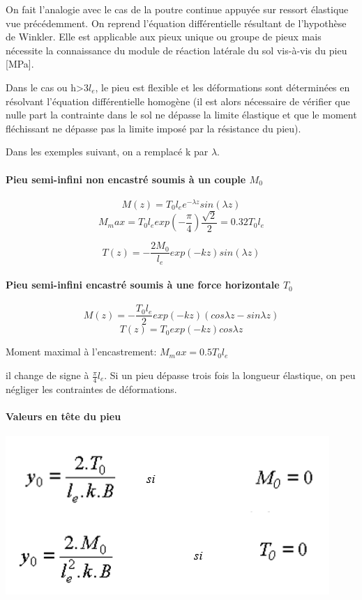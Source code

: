 On fait l'analogie avec le cas de la poutre continue appuyée sur ressort élastique vue précédemment. On reprend l'équation différentielle résultant de l'hypothèse de Winkler. Elle est applicable aux pieux unique ou groupe de pieux mais nécessite la connaissance du module de réaction latérale du sol vis-à-vis du pieu [MPa].

Dans le cas ou h>3$l_e$, le pieu est flexible et les déformations sont déterminées en résolvant l'équation différentielle homogène (il est alors nécessaire de vérifier que nulle part la contrainte dans le sol ne dépasse la limite élastique et que le moment fléchissant ne dépasse pas la limite imposé par la résistance du pieu).

Dans les exemples suivant, on a remplacé k par $\lambda$.

\paragraph{Pieu semi-infini non encastré soumis à un couple $M_0$}

$$M(z) = T_0 l_e e^{-\lambda z} sin(\lambda z)$$
$$M_max=T_0l_e exp(-\frac{\pi}{4})\frac{\sqrt{2}}{2} = 0.32 T_0 l_e $$ 

$$T(z) = -\frac{2M_0}{l_e} exp(-kz) sin(\lambda z)$$

\paragraph{Pieu semi-infini encastré soumis à une force horizontale $T_0$}

$$M(z)=-\frac{T_0 l_e}{2} exp(-kz) (cos \lambda z - sin \lambda z) $$
$$T(z) = T_0 exp(-kz) cos \lambda z$$

Moment maximal à l'encastrement: $M_max=0.5 T_0 l_e$ 

il change de signe à $\frac{\pi}{4} l_e$. Si un pieu dépasse trois fois la longueur élastique, on peu négliger les contraintes de déformations.

\paragraph{Valeurs en tête du pieu}

\begin{center}
\includegraphics [scale=0.7]{pictures/abc.PNG}
\end{center}

